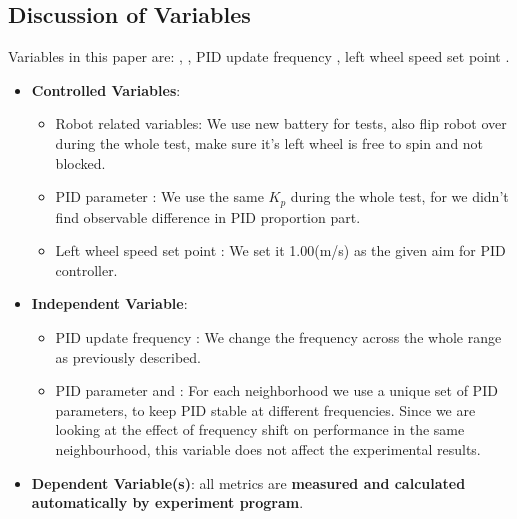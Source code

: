 \documentclass[conference]{IEEEtran}
\begin{document}
\subsection{Discussion of Variables}
Variables in this paper are: , , PID update frequency , left wheel speed set point .
\begin{itemize}
    \item \textbf{Controlled Variables}: 
        \begin{itemize}
            \item Robot related variables: We use new battery for tests, also flip robot over during the whole test, make sure it's left wheel is free to spin and not blocked.
            \item PID parameter : We use the same $K_{p}$ during the whole test, for we didn't find observable difference in PID proportion part.
            \item Left wheel speed set point : We set it 1.00(m/s) as the given aim for PID controller.
        \end{itemize}
    \item \textbf{Independent Variable}: 
        \begin{itemize}
            \item PID update frequency : We change the frequency across the whole range as previously described. 
            \item PID parameter  and : For each neighborhood we use a unique set of PID parameters, to keep PID stable at different frequencies. Since we are looking at the effect of frequency shift on performance in the same neighbourhood, this variable does not affect the experimental results. 
        \end{itemize}
    \item \textbf{Dependent Variable(s)}:  all metrics are \textbf{measured and calculated automatically by experiment program}.

\end{itemize}
\end{document}
